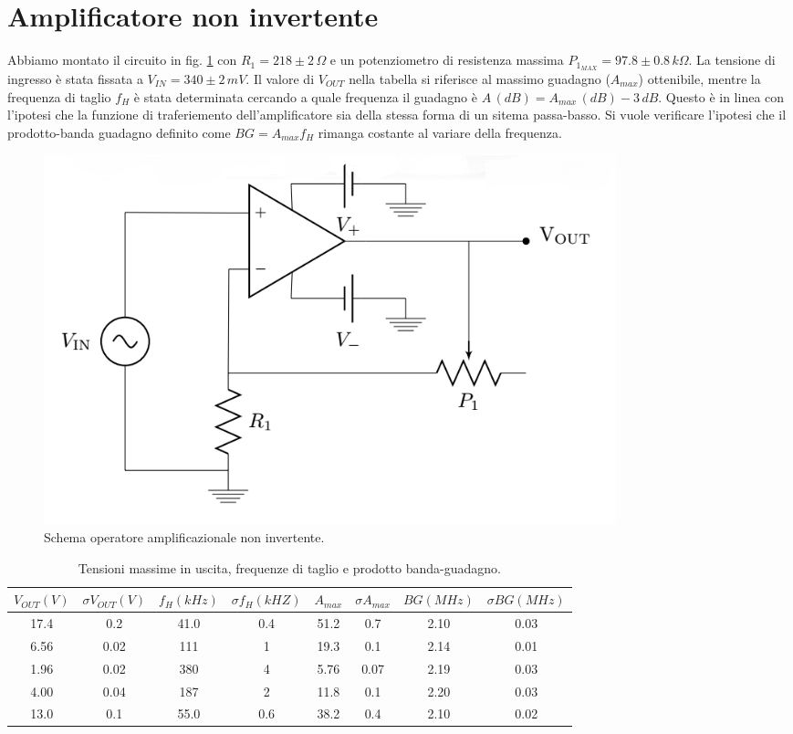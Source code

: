 \documentclass[10pt,a4paper]{article}
\begin{document}
\section{Amplificatore non invertente}
Abbiamo montato il circuito in fig. \ref{opampnoninvert} con $R_1=218 \pm 2 \,  \Omega$ e  un potenziometro di resistenza massima $P_{1_{MAX}}= 97.8 \pm 0.8 \, k\Omega$. La tensione di ingresso è stata fissata a $V_{IN} = 340 \pm 2 \, mV$.
Il valore di $V_{OUT}$ nella tabella si riferisce al massimo guadagno ($A_{max}$) ottenibile, mentre la frequenza di taglio $f_H$ è stata determinata cercando a quale frequenza il  guadagno è $A\,(dB)= A_{max}\,(dB) - 3 \,dB$. Questo  è in linea con l'ipotesi che la funzione di traferiemento dell'amplificatore  sia della stessa forma di un sitema passa-basso. Si vuole verificare l'ipotesi che il prodotto-banda guadagno definito come $BG = A_{max} f_H$ rimanga costante al variare della frequenza. 

\begin{figure}[!htb]
  \centering
  \includegraphics[scale=0.5]{opampnoninvert.png}
\caption{Schema operatore amplificazionale non invertente.}
\label{opampnoninvert}
\end{figure}

\begin{table}[!htb]\centering
\begin{tabular}{|c|c|c|c|c|c|c|c|}
\hline
$V_{OUT} (V)$ & $\sigma V_{OUT} (V)$ & $ f_H(kHz) $ & $ \sigma f_H(kHZ)$ & $A_{max}$ & $\sigma A_{max}$ & $BG (MHz)$ & $\sigma BG (MHz)$\\    
\hline
17.4 & 0.2 & 41.0 & 0.4 & 51.2 & 0.7 & 2.10 & 0.03\\
6.56 & 0.02 & 111 & 1 & 19.3 & 0.1 & 2.14 & 0.01\\
1.96 & 0.02 & 380 & 4 & 5.76 & 0.07 & 2.19 & 0.03\\
4.00 & 0.04 & 187 & 2 & 11.8 & 0.1 & 2.20 & 0.03\\
13.0 & 0.1 & 55.0 & 0.6 & 38.2 & 0.4 & 2.10 & 0.02\\
\hline
\end{tabular}
\caption{Tensioni massime in uscita, frequenze di taglio e prodotto banda-guadagno.}
\label{tabellaBG}
\end{table}
\end{document}
